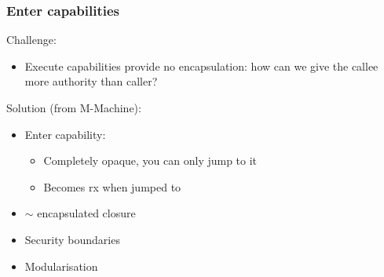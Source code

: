 \documentclass{beamer}
\begin{document}
\begin{frame}
  \frametitle{Enter capabilities}
  Challenge:
  \begin{itemize}
  \item Execute capabilities provide no encapsulation: how can we give the
    callee more authority than caller?
  \end{itemize}
  \pause
  Solution (from M-Machine):
  \begin{itemize}
  \item Enter capability:
    \begin{itemize}
    \item Completely opaque, you can only jump to it
    \item Becomes rx when jumped to
    \end{itemize}
  \item $\sim$ encapsulated closure
  \item Security boundaries
  \item Modularisation
  \end{itemize}
\end{frame}
\end{document}
